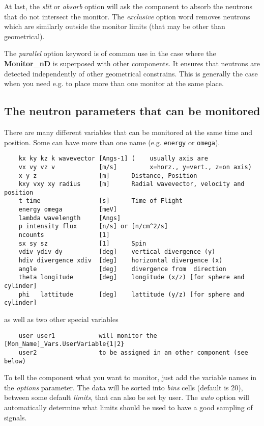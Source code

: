 At last, the {\it slit} or {\it absorb} option will ask the component to
absorb the neutrons that do not intersect the monitor. The {\it exclusive} option word removes neutrons which are similarly outside the monitor limits (that may be other than geometrical).

The {\it parallel} option keyword is of common use in the case where the {\bf Monitor\_nD} is superposed with other components. It ensures that neutrons are detected independently of other geometrical constrains. This is generally the case when you need e.g. to place more than one monitor at the same place.

\subsection{The neutron parameters that can be monitored}

There are many different variables that can be monitored at the same time
and position. Some can have more than one name (e.g. \texttt{energy} or
\texttt{omega}).


\begin{verbatim}
    kx ky kz k wavevector [Angs-1] (    usually axis are
    vx vy vz v            [m/s]         x=horz., y=vert., z=on axis)
    x y z                 [m]      Distance, Position
    kxy vxy xy radius     [m]      Radial wavevector, velocity and position
    t time                [s]      Time of Flight
    energy omega          [meV]
    lambda wavelength     [Angs]
    p intensity flux      [n/s] or [n/cm^2/s]
    ncounts               [1]
    sx sy sz              [1]      Spin
    vdiv ydiv dy          [deg]    vertical divergence (y)
    hdiv divergence xdiv  [deg]    horizontal divergence (x)
    angle                 [deg]    divergence from  direction
    theta longitude       [deg]    longitude (x/z) [for sphere and cylinder]
    phi   lattitude       [deg]    lattitude (y/z) [for sphere and cylinder]
\end{verbatim}
as well as two other special variables
\begin{verbatim}
    user user1            will monitor the [Mon_Name]_Vars.UserVariable{1|2}
    user2                 to be assigned in an other component (see below)
\end{verbatim}

To tell the component what you want to monitor, just add the variable
names in the {\it options} parameter. The data will be sorted into {\it
  bins} cells (default is 20), between some default {\it limits}, that
can also be set by user. The {\it auto} option will automatically
determine what limits should be used to have a good sampling of signals.

